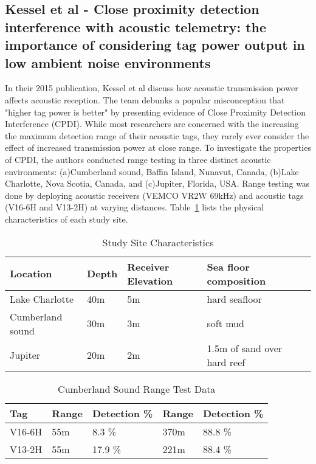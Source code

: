 \subsection{Kessel et al - Close proximity detection interference with acoustic telemetry: the importance of considering tag power output in low ambient noise environments}
In their 2015 publication, Kessel et al\cite{Kessel2015} discuss how acoustic transmission power affects acoustic reception.  The team debunks a popular misconception that "higher tag power is better" by presenting evidence of Close Proximity Detection Interference (CPDI).  While most researchers are concerned with the increasing the maximum detection range of their acoustic tags, they rarely ever consider the effect of increased transmission power at close range.  To investigate the properties of CPDI, the authors conducted range testing in three distinct acoustic environments: (a)Cumberland sound, Baffin Island, Nunavut, Canada, (b)Lake Charlotte, Nova Scotia, Canada, and (c)Jupiter, Florida, USA.  Range testing was done by deploying acoustic receivers (VEMCO VR2W 69kHz) and acoustic tags (V16-6H and V13-2H) at varying distances.  Table~\ref{CPDItable} lists the physical characteristics of each study site.

\begin{table}[ht]
	\begin{tabular}{l l l l l}
		Location&Depth&Receiver Elevation&Sea floor composition\\
		\hline
		Lake Charlotte			& 40m	& 5m	& hard seafloor \\
		Cumberland sound		& 30m	& 3m	& soft mud	\\
		Jupiter		& 20m	& 2m	& 1.5m of sand over hard reef\\
	\end{tabular}
	\caption{Study Site Characteristics
		\label{CPDItable}}
\end{table}

\begin{table}[ht]
	\begin{tabular}{l l l l l}
		Tag	&Range	&Detection \%	&Range	&Detection \%\\
		\hline
		V16-6H	&55m	& 8.3 \%		&370m	&88.8 \%\\
		V13-2H	&55m 	& 17.9 \%	&221m	&88.4 \%\\
	\end{tabular}
	\caption{Cumberland Sound Range Test Data
		\label{rangeTestData}}
\end{table}

